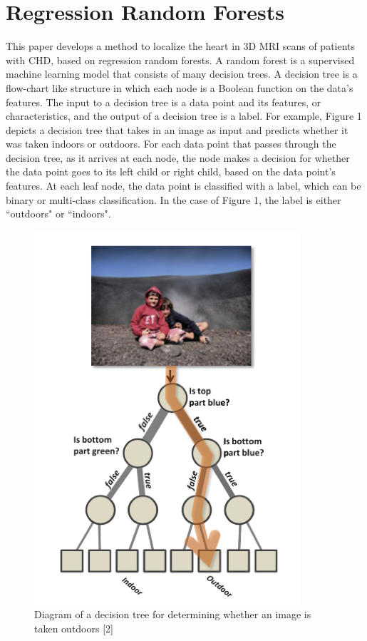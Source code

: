 \section{Regression Random Forests}
This paper develops a method to localize the heart in 3D MRI scans of patients with CHD, based on regression random forests. A random forest is a supervised machine learning model that consists of many decision trees. A decision tree is a flow-chart like structure in which each node is a Boolean function on the data's features. The input to a decision tree is a data point and its features, or characteristics, and the output of a decision tree is a label. For example, Figure 1 depicts a decision tree that takes in an image as input and predicts whether it was taken indoors or outdoors. For each data point that passes through the decision tree, as it arrives at each node, the node makes a decision for whether the data point goes to its left child or right child, based on the data point's features. At each leaf node, the data point is classified with a label, which can be binary or multi-class classification. In the case of Figure 1, the label is either ``outdoors" or ``indoors".

\begin{figure}
\includegraphics[scale=0.5]{decisiontree.png}
\caption{Diagram of a decision tree for determining whether an image is taken outdoors [2]}
\end{figure}

